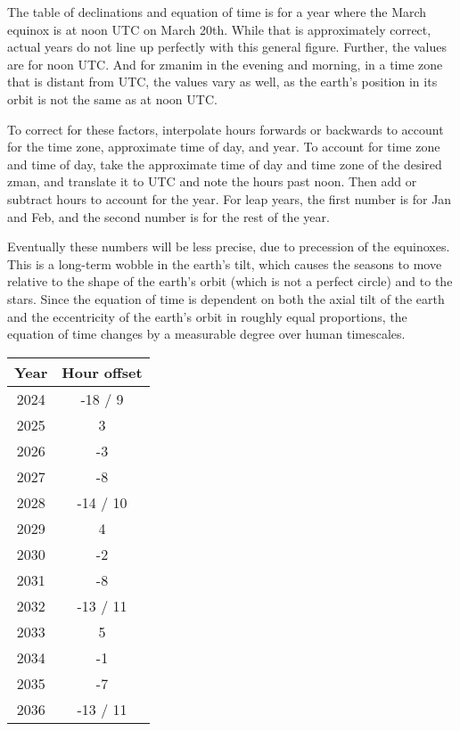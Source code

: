The table of declinations and equation of time is for a year where the March equinox is at noon UTC on March 20th.  While that is approximately correct, actual years do not line up perfectly with this general figure. Further, the values are for noon UTC.  And for zmanim in the evening and morning, in a time zone that is distant from UTC, the values vary as well, as the earth's position in its orbit is not the same as at noon UTC.

To correct for these factors, interpolate hours forwards or backwards to account for the time zone, approximate time of day, and year.  To account for time zone and time of day, take the approximate time of day and time zone of the desired zman, and translate it to UTC and note the hours past noon.  Then add or subtract hours to account for the year.  For leap years, the first number is for Jan and Feb, and the second number is for the rest of the year.

Eventually these numbers will be less precise, due to precession of the equinoxes. This is a long-term wobble in the earth's tilt, which causes the seasons to move relative to the shape of the earth's orbit (which is not a perfect circle) and to the stars. Since the equation of time is dependent on both the axial tilt of the earth and the eccentricity of the earth's orbit in roughly equal proportions, the equation of time changes by a measurable degree over human timescales.

\begin{tabular}{c | c}
	Year & Hour offset\\\hline
	2024 & -18 / 9 \\\hline
	2025 & 3 \\\hline
	2026 & -3 \\\hline
	2027 & -8 \\\hline
	2028 & -14 / 10 \\\hline
	2029 & 4 \\\hline
	2030 & -2 \\\hline
	2031 & -8 \\\hline
	2032 & -13 / 11 \\\hline
	2033 & 5 \\\hline
	2034 & -1 \\\hline
	2035 & -7 \\\hline
	2036 & -13 / 11
\end{tabular}

